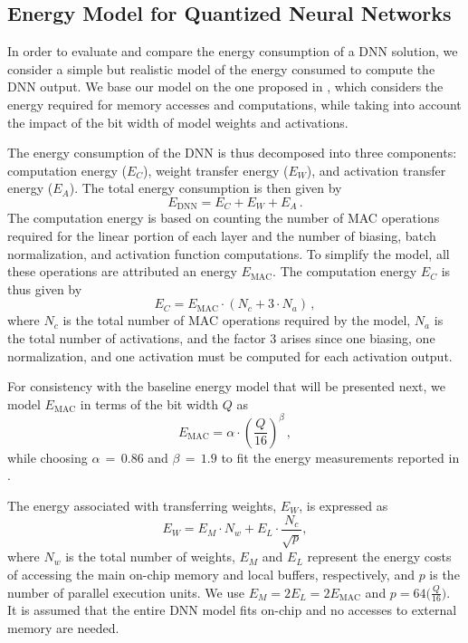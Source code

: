 \subsection{Energy Model for Quantized Neural Networks}\label{sec:energy_dnn}
In order to evaluate and compare the energy consumption of a \gls{DNN} solution, we consider a simple but realistic model of the energy consumed to compute the \gls{DNN} output.
We base our model on the one proposed in \cite{moons:2017a}, which considers the energy required for memory accesses and computations, while taking into account the impact of the bit width of model weights and activations.

The energy consumption of the DNN is thus decomposed into three components: computation energy (\(E_C\)), weight transfer energy (\(E_W\)), and activation transfer energy (\(E_A\)). 
The total energy consumption is then given by
\begin{equation}\label{eq:total-energy}
    E_{\mathrm{DNN}} = E_C + E_W + E_A \,.
\end{equation}
%
The computation energy is based on counting the number of \gls{MAC} operations required for the linear portion of each layer and the number of biasing, batch normalization, and activation function computations. To simplify the model, all these operations are attributed an energy $E_{\text{MAC}}$.
The computation energy $E_C$ is thus given by
\begin{equation}\label{eq:computation-energy}
    E_C = E_{\text{MAC}} \cdot (N_c + 3 \cdot N_a)\,,
\end{equation}
where $N_c$ is the total number of MAC operations required by the model, $N_a$ is the total number of activations, and the factor $3$ arises since one biasing, one normalization, and one activation must be computed for each activation output.

For consistency with the baseline energy model that will be presented next, we model $E_\text{MAC}$ in terms of the bit width $Q$ as
\begin{equation}\label{eq:mac-energy}
    E_{\text{MAC}} = \alpha \cdot \left( \frac{Q}{16} \right)^{\beta}\,,
\end{equation}
while choosing $\alpha$\,$=$\,$0.86$ and $\beta$\,$=$\,$1.9$ to fit the energy measurements reported in \cite{6757323}.

The energy associated with transferring weights, \(E_W\), is expressed as
\begin{equation}\label{eq:weight-energy}
    E_W = E_M \cdot N_w + E_L \cdot \frac{N_c}{\sqrt{p}},
\end{equation}
where \(N_w\) is the total number of weights, \(E_M\) and \(E_L\) represent the energy costs of accessing the main on-chip memory and local buffers, respectively, and $p$ is the number of parallel execution units.
We use $E_M=2 E_L=2 E_\mathrm{MAC}$ and  \(p =
64 \big(\frac{Q}{16}\big)\).
It is assumed that the entire DNN model fits on-chip and no accesses to external memory are needed.


